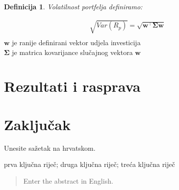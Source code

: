 \documentclass[zavrsnirad]{fer}
\newtheorem{definition}{Definicija}
\begin{document}
\begin{definition}
    Volatilnost portfelja definiramo:
\end{definition}
\begin{align*}
    \sqrt{Var(R_p)} = \sqrt{\mathbf{w^\intercal}\boldsymbol{\Sigma} \mathbf{w}}\\
\end{align*}
\indent \quad \quad $\mathbf{w}$ je ranije definirani vektor udjela investicija\\
\indent \quad \quad $\boldsymbol{\Sigma}$ je matrica kovarijance slučajnog vektora $\mathbf{w}$\\


\chapter{Rezultati i rasprava}
\label{pog:rezultati_i_rasprava}

\Blindtext

\chapter{Zaključak}
\label{pog:zakljucak}

\blindtext





\begin{sazetak}
  Unesite sažetak na hrvatskom.

  \blindtext
\end{sazetak}

\begin{kljucnerijeci}
  prva ključna riječ; druga ključna riječ; treća ključna riječ
\end{kljucnerijeci}

\begin{abstract}
  Enter the abstract in English.

  \blindtext
\end{abstract}
\end{document}
